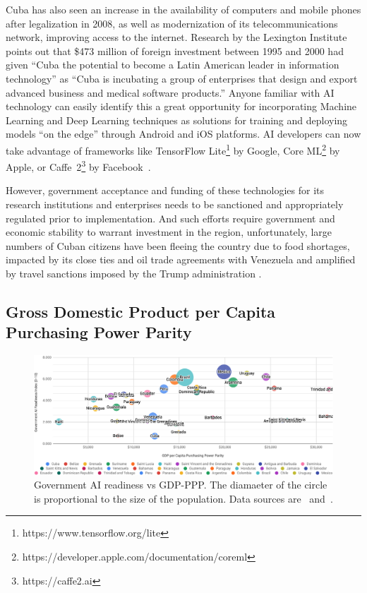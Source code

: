 \documentclass[conference]{IEEEtran}
\begin{document}
Cuba has also seen an increase in the availability of computers and mobile phones after legalization in 2008, as well as modernization of its telecommunications network, improving access to the internet. Research by the Lexington Institute~\cite{peters2001cuba} points out that \$473 million of foreign investment between 1995 and 2000 had given ``Cuba the potential to become a Latin American leader in information technology'' as ``Cuba is incubating a group of enterprises that design and export advanced business and medical software products.'' Anyone familiar with AI technology can easily identify this a great opportunity for incorporating Machine Learning and Deep Learning techniques as solutions for training and deploying models ``on the edge'' through Android and iOS platforms. AI developers can now take advantage of frameworks like TensorFlow Lite\footnote{https://www.tensorflow.org/lite} by Google, Core ML\footnote{https://developer.apple.com/documentation/coreml} by Apple, or Caffe~2\footnote{https://caffe2.ai} by Facebook~\cite{jia2016delivering}.

However, government acceptance and funding of these technologies for its research institutions and enterprises needs to be sanctioned and appropriately regulated prior to implementation. And such efforts require government and economic stability to warrant investment in the region, unfortunately, large numbers of Cuban citizens have been fleeing the country due to food shortages, impacted by its close ties and oil trade agreements with Venezuela and amplified by travel sanctions imposed by the Trump administration \cite{cordoba2019cuba}.


\subsection{Gross Domestic Product per Capita Purchasing Power Parity}

\begin{figure}[!t]
\centering
\includegraphics[width=\textwidth]{gdp-ppp}
\caption{Government AI readiness vs GDP-PPP. The diamaeter of the circle is proportional to the size of the population. Data sources are~\cite{miller2019government} and~\cite{central2019world}.}
\label{fig:gdp-ppp}
\end{figure}
\end{document}
